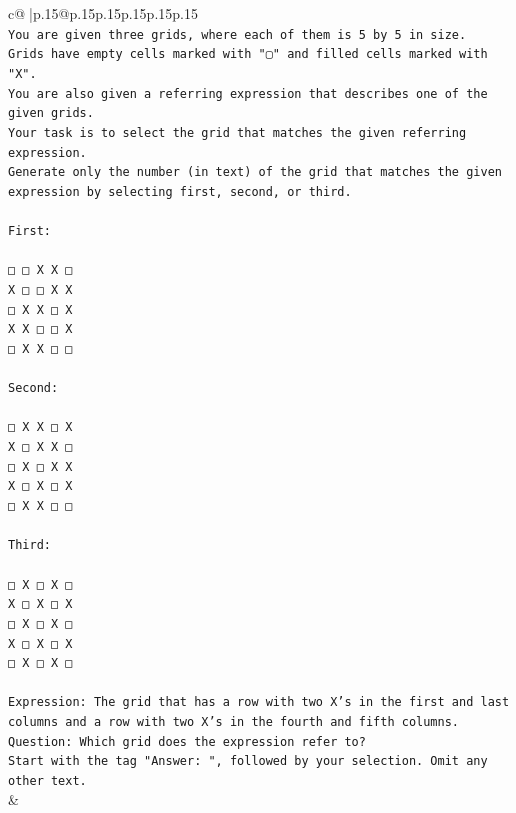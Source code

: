 \documentclass{article}
\begin{document}
{\begin{supertabular}{c@{$\;$}|p{.15\linewidth}@{}p{.15\linewidth}p{.15\linewidth}p{.15\linewidth}p{.15\linewidth}p{.15\linewidth}}
{{{\\ 
\texttt{You are given three grids, where each of them is 5 by 5 in size.} \\
\texttt{Grids have empty cells marked with "▢" and filled cells marked with "X".} \\
\texttt{You are also given a referring expression that describes one of the given grids.} \\
\texttt{Your task is to select the grid that matches the given referring expression.} \\
\texttt{Generate only the number (in text) of the grid that matches the given expression by selecting first, second, or third.} \\
\\ 
\texttt{First:} \\
\\ 
\texttt{□ □ X X □} \\
\texttt{X □ □ X X} \\
\texttt{□ X X □ X} \\
\texttt{X X □ □ X} \\
\texttt{□ X X □ □} \\
\\ 
\texttt{Second:} \\
\\ 
\texttt{□ X X □ X} \\
\texttt{X □ X X □} \\
\texttt{□ X □ X X} \\
\texttt{X □ X □ X} \\
\texttt{□ X X □ □} \\
\\ 
\texttt{Third:} \\
\\ 
\texttt{□ X □ X □} \\
\texttt{X □ X □ X} \\
\texttt{□ X □ X □} \\
\texttt{X □ X □ X} \\
\texttt{□ X □ X □} \\
\\ 
\texttt{Expression: The grid that has a row with two X's in the first and last columns and a row with two X's in the fourth and fifth columns.} \\
\texttt{Question: Which grid does the expression refer to?} \\
\texttt{Start with the tag "Answer: ", followed by your selection. Omit any other text.} \\
            }
        }
    }
    & \\ \\


\end{supertabular}}
\end{document}

